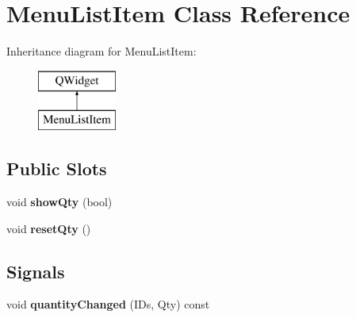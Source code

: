 \hypertarget{classMenuListItem}{\section{Menu\-List\-Item Class Reference}
\label{classMenuListItem}
}
Inheritance diagram for Menu\-List\-Item\-:\begin{figure}[H]
\begin{center}
\leavevmode
\includegraphics[height=2.000000cm]{classMenuListItem}
\end{center}
\end{figure}
\subsection*{Public Slots}
\begin{DoxyCompactItemize}
\item 
\hypertarget{classMenuListItem_a6bd73a8647102fc90684f4d056401a36}{void {\bfseries show\-Qty} (bool)}\label{classMenuListItem_a6bd73a8647102fc90684f4d056401a36}

\item 
\hypertarget{classMenuListItem_aa648340844394f75e14c02b29e99d290}{void {\bfseries reset\-Qty} ()}\label{classMenuListItem_aa648340844394f75e14c02b29e99d290}

\end{DoxyCompactItemize}
\subsection*{Signals}
\begin{DoxyCompactItemize}
\item 
\hypertarget{classMenuListItem_ac15f39d6de157c409990370b925d5e09}{void {\bfseries quantity\-Changed} (I\-Ds, Qty) const }\label{classMenuListItem_ac15f39d6de157c409990370b925d5e09}

\end{DoxyCompactItemize}
